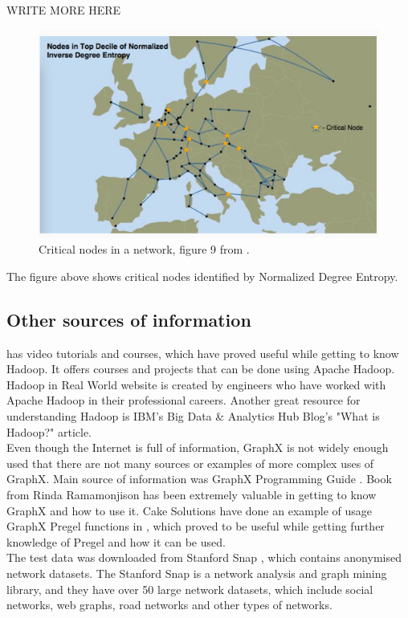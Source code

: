 \documentclass{article}
\theoremstyle{definition}
\begin{document}
WRITE MORE HERE

\begin{figure}[H]
\centering
\includegraphics[scale=0.6]{nodeimportance}
\caption{Critical nodes in a network, figure 9 from \cite{Tee2016b}.}
\end{figure}

The figure above shows critical nodes identified by Normalized Degree Entropy. 

\subsection{Other sources of information}
\cite{hadooprealworld} has video tutorials and courses, which have proved useful while getting to know Hadoop. It offers courses and projects that can be done using Apache Hadoop. Hadoop in Real World website is created by engineers who have worked with Apache Hadoop in their professional careers. 
Another great resource for understanding Hadoop is IBM's Big Data \& Analytics Hub Blog's "What is Hadoop?" \cite{ibmhadoop} article. \\

Even though the Internet is full of information, GraphX is not widely enough used that there are not many sources or examples of more complex uses of GraphX. Main source of information was GraphX Programming Guide \cite{GraphX}. Book from Rinda Ramamonjison \cite{graphxbook} has been extremely valuable in getting to know GraphX and how to use it. Cake Solutions have done an example of usage GraphX Pregel functions in \cite{cakesolutions}, which proved to be useful while getting further knowledge of Pregel and how it can be used. \\

The test data was downloaded from Stanford Snap \cite{snap}, which contains anonymised network datasets. The Stanford Snap is a network analysis and graph mining library, and they have over 50 large network datasets, which include social networks, web graphs, road networks and other types of networks. \\
\end{document}

